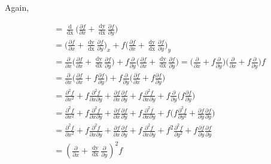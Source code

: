 \documentclass[12 pt]{article}
\begin{document}
	Again, 
	
	\begin{equation*}
		\begin{split}
			\frac{\mathop{\mathrm{d^{2}f}}}{\mathop{\mathrm{dx^{2}}}} &= \frac{\mathop{\mathrm{d}}}{\mathop{\mathrm{dx}}}\bigg(\frac{\partial f}{\partial x} + \frac{\mathop{\mathrm{dy}}}{\mathop{\mathrm{dx}}}\frac{\partial f}{\partial y}\bigg)\\ 
			&=  \bigg(\frac{\partial f}{\partial x}+\frac{\mathop{\mathrm{dy}}}{\mathop{\mathrm{dx}}}\frac{\partial f}{\partial y}\bigg)_{x} +   f\bigg(\frac{\partial f}{\partial x}+\frac{\mathop{\mathrm{dy}}}{\mathop{\mathrm{dx}}}\frac{\partial f}{\partial y}\bigg)_{y}\\
			&= \frac{\partial }{\partial x}\bigg(\frac{\partial f}{\partial x}+\frac{\mathop{\mathrm{dy}}}{\mathop{\mathrm{dx}}}\frac{\partial f}{\partial y}\bigg)+f\frac{\partial }{\partial y}\bigg(\frac{\partial f}{\partial x}+\frac{\mathop{\mathrm{dy}}}{\mathop{\mathrm{dx}}}\frac{\partial f}{\partial y}\bigg)=\bigg(\frac{\partial }{\partial x}+f\frac{\partial }{\partial y}\bigg)\bigg(\frac{\partial }{\partial x}+f\frac{\partial }{\partial y}\bigg)f\\
			&= \frac{\partial }{\partial x}\bigg(\frac{\partial f}{\partial x}+f\frac{\partial f}{\partial y}\bigg)+f\frac{\partial }{\partial y}\bigg(\frac{\partial f}{\partial x}+f\frac{\partial f}{\partial y}\bigg)\\
			&= \frac{\partial^{2}f}{\partial x^{2}} + f\frac{\partial^{2}f}{\partial x \partial y}+\frac{\partial f}{\partial x}\frac{\partial f}{\partial y} + f\frac{\partial^{2}f}{\partial x \partial y} + f\frac{\partial }{\partial y}\bigg(f\frac{\partial f}{\partial y}\bigg)\\
			&= \frac{\partial^{2}f}{\partial x^{2}} + f\frac{\partial^{2}f}{\partial x \partial y}+\frac{\partial f}{\partial x}\frac{\partial f}{\partial y} + f\frac{\partial^{2}f}{\partial x \partial y} + f\bigg(f\frac{\partial^{2}f}{\partial y^{2}}+\frac{\partial f}{\partial y}\frac{\partial f}{\partial y}\bigg)\\
			&= \frac{\partial^{2}f}{\partial x^{2}} + f\frac{\partial^{2}f}{\partial x \partial y}+\frac{\partial f}{\partial x}\frac{\partial f}{\partial y} + f\frac{\partial^{2}f}{\partial x \partial y} + f^{2}\frac{\partial^{2}f}{\partial y^{2}}+f\frac{\partial f}{\partial y}\frac{\partial f}{\partial y}\\
			&=  (\frac{\partial }{\partial x} + \frac{\mathop{\mathrm{dy}}}{\mathop{\mathrm{dx}}}\frac{\partial }{\partial y})^{2}f\\
		\end{split}
	\end{equation*}
	
\end{document}
